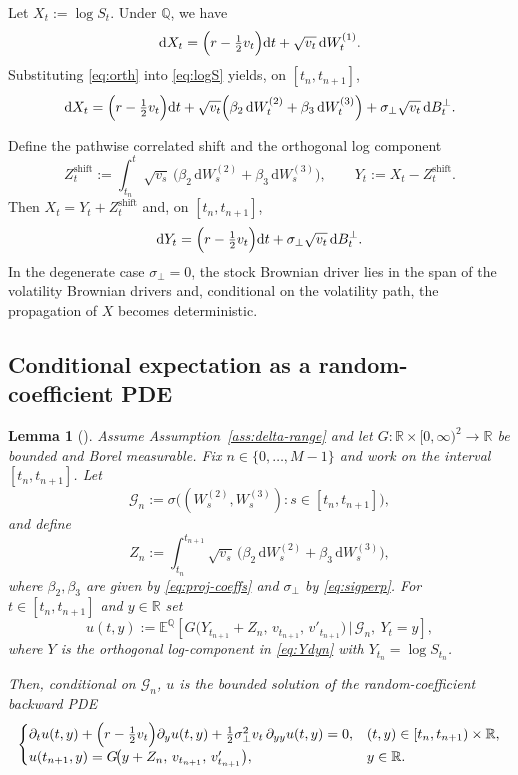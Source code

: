 \documentclass[10pt]{article}
\theoremstyle{plain}
\newtheorem{lemma}[theorem]{Lemma}
\theoremstyle{definition}
\theoremstyle{remark}
\newcommand{\dd}{\mathrm d}
\newcommand{\E}{\mathbb E}
\newcommand{\Q}{\mathbb Q}
\newcommand{\R}{\mathbb R}
\begin{document}
Let $X_t:=\log S_t$. Under $\Q$, we have
\begin{equation}\label{eq:logS}
\dd X_t=\Bigl(r-\tfrac12 v_t\Bigr)\dd t+\sqrt{v_t}\,\dd W^{(1)}_t.
\end{equation}
Substituting \eqref{eq:orth} into \eqref{eq:logS} yields, on $[t_n,t_{n+1}]$,
\begin{equation}\label{eq:logS-orth}
\dd X_t=\Bigl(r-\tfrac12 v_t\Bigr)\dd t
+\sqrt{v_t}\Bigl(\beta_2\,\dd W^{(2)}_t+\beta_3\,\dd W^{(3)}_t\Bigr)
+\sigma_\perp\sqrt{v_t}\,\dd B^\perp_t.
\end{equation}

Define the pathwise correlated shift and the orthogonal log component
\begin{equation}\label{eq:Zshift}
Z^{\mathrm{shift}}_t:=\int_{t_n}^t \sqrt{v_s}\,\bigl(\beta_2\,\dd W^{(2)}_s+\beta_3\,\dd W^{(3)}_s\bigr),
\qquad
Y_t:=X_t-Z^{\mathrm{shift}}_t.
\end{equation}
Then $X_t=Y_t+Z^{\mathrm{shift}}_t$ and, on $[t_n,t_{n+1}]$,
\begin{equation}\label{eq:Ydyn}
\dd Y_t=\Bigl(r-\tfrac12 v_t\Bigr)\dd t+\sigma_\perp\sqrt{v_t}\,\dd B^\perp_t.
\end{equation}
In the degenerate case $\sigma_\perp=0$, the stock Brownian driver lies in the span of the
volatility Brownian drivers and, conditional on the volatility path, the propagation of $X$
becomes deterministic.






\subsection{Conditional expectation as a random-coefficient PDE}

\begin{lemma}[]\label{lem:cond-PDE}
Assume Assumption~\ref{ass:delta-range} and let $G:\R\times[0,\infty)^2\to\R$ be bounded and Borel measurable.
Fix $n\in\{0,\dots,M-1\}$ and work on the interval $[t_n,t_{n+1}]$.
Let
\[
\mathcal G_n := \sigma\bigl((W^{(2)}_s,W^{(3)}_s): s\in[t_n,t_{n+1}]\bigr),
\]
and define 
\[
Z_n := \int_{t_n}^{t_{n+1}} \sqrt{v_s}\,\bigl(\beta_2\,\dd W^{(2)}_s+\beta_3\,\dd W^{(3)}_s\bigr),
\]
where $\beta_2,\beta_3$ are given by \eqref{eq:proj-coeffs} and $\sigma_\perp$ by \eqref{eq:sigperp}.
For $t\in[t_n,t_{n+1}]$ and $y\in\R$ set
\[
u(t,y)
:=
\E^\Q\!\left[
G\!\bigl(Y_{t_{n+1}}+Z_n,\,v_{t_{n+1}},\,v'_{t_{n+1}}\bigr)\,\Big|\,\mathcal G_n,\ Y_t=y
\right],
\]
where $Y$ is the orthogonal log-component in \eqref{eq:Ydyn} with $Y_{t_n}=\log S_{t_n}$.

Then, conditional on $\mathcal G_n$, $u$ is the bounded solution of the random-coefficient backward PDE
\[
\begin{cases}
\partial_t u(t,y)+\Bigl(r-\tfrac12 v_t\Bigr)\partial_y u(t,y)
+\tfrac12\sigma_\perp^2 v_t\,\partial_{yy}u(t,y)=0,
& (t,y)\in[t_n,t_{n+1})\times\R,\\[2pt]
u(t_{n+1},y)=G\!\bigl(y+Z_n,\,v_{t_{n+1}},\,v'_{t_{n+1}}\bigr),
& y\in\R.
\end{cases}
\]
\end{lemma}
\end{document}
